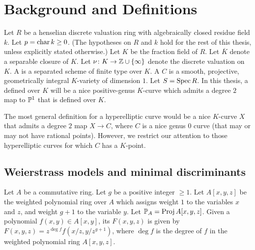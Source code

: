 \chapter{Background and Definitions}\label{chapdef}
Let $R$ be a henselian discrete valuation ring with algebraically closed residue field $k$. Let $p = \cha k \geq 0$. (The hypotheses on $R$ and $k$ hold for the rest of this thesis, unless explicitly stated otherwise.) Let $K$ be the fraction field of $R$. Let $\overline{K}$ denote a separable closure of $K$. Let $\nu \colon K \rightarrow \Z \cup \{\infty\}$ denote the discrete valuation on $K$. A {} is a separated scheme of finite type over $K$. A {} $C$ is a smooth, projective, geometrically integral $K$-variety of dimension $1$. Let $S = \Spec R$. In this thesis, a {} defined over $K$ will be a nice positive-genus $K$-curve which admits a degree $2$ map to $\P^1$ that is defined over $K$. 

\begin{rmk}
 The most general definition for a hyperelliptic curve would be a nice $K$-curve $X$ that admits a degree $2$ map $X \rightarrow C$, where $C$ is a nice genus $0$ curve (that may or may not have rational points). However, we restrict our attention to those hyperelliptic curves for which $C$ has a $K$-point.
\end{rmk}

\section{Weierstrass models and minimal discriminants}\label{defmindisc}
Let $A$ be a commutative ring. Let $g$ be a positive integer $\geq 1$. Let $A[x,y,z]$ be the weighted polynomial ring over $A$  which assigns weight $1$ to the variables $x$ and $z$, and weight $g+1$ to the variable $y$. Let $\P_A = \Proj A[x,y,z]$. Given a polynomial $f(x,y) \in A[x,y]$, its {} $F(x,y,z)$ is given by $F(x,y,z) = z^{\deg f} f(x/z,y/z^{g+1})$, where $\deg f$ is the degree of $f$ in the weighted polynomial ring $A[x,y,z]$.

